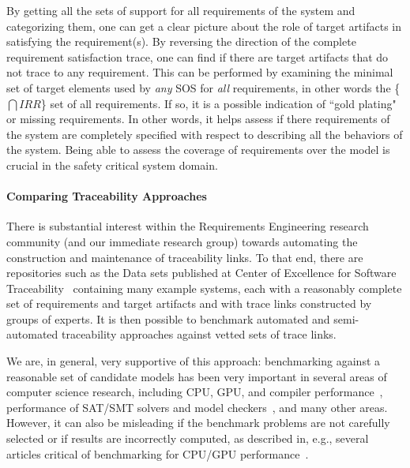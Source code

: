 By getting all the sets of support for all requirements of the system and categorizing them, one can get a clear picture about the role of target artifacts in satisfying the requirement(s). By reversing the direction of the complete requirement satisfaction trace, one can find if there are target artifacts that do not trace to any requirement.  This can be performed by examining the minimal set of target elements used by {\em any} SOS for {\em all} requirements, in other words the \{$\bigcap IRR$\} set of all requirements.  If so, it is a possible indication of ``gold plating" or missing requirements. In other words, it helps assess if there requirements of the system are completely specified with respect to describing all the behaviors of the system. Being able to assess the coverage of requirements over the model is crucial in the safety critical system domain.

\paragraph{Comparing Traceability Approaches}
There is substantial interest within the Requirements Engineering research community (and our immediate research group) towards automating the construction and maintenance of traceability links.  To that end, there are repositories such as the Data sets published at  Center of Excellence for Software Traceability~\cite{COEST} containing many example systems, each with a reasonably complete set of requirements and target artifacts and with trace links constructed by groups of experts.  It is then possible to benchmark automated and semi-automated traceability approaches against vetted sets of trace links.

We are, in general, very supportive of this approach: benchmarking against a reasonable set of candidate models has been very important in several areas of computer science research, including CPU, GPU, and compiler performance~, performance of SAT/SMT solvers and model checkers~, and many other areas.  However, it can also be misleading if the benchmark problems are not carefully selected or if results are incorrectly computed, as described in, e.g., several articles critical of benchmarking for CPU/GPU performance~.

